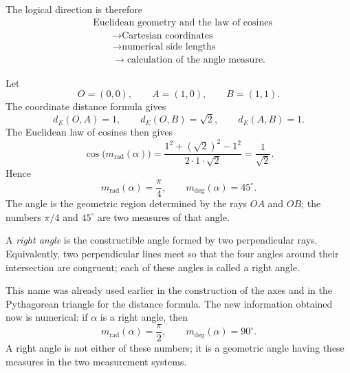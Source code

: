The logical direction is therefore
\[
\begin{aligned}
&\text{Euclidean geometry and the law of cosines}\\
&\qquad\longrightarrow\text{Cartesian coordinates}\\
&\qquad\longrightarrow\text{numerical side lengths}\\
&\qquad\longrightarrow\text{calculation of the angle measure}.
\end{aligned}
\]

\begin{examplebox}
Let
\[
O=(0,0),\qquad A=(1,0),\qquad B=(1,1).
\]
The coordinate distance formula gives
\[
d_E(O,A)=1,
\qquad
d_E(O,B)=\sqrt2,
\qquad
d_E(A,B)=1.
\]
The Euclidean law of cosines then gives
\[
\cos\bigl(m_{\mathrm{rad}}(\alpha)\bigr)
=
\frac{1^2+(\sqrt2)^2-1^2}{2\cdot1\cdot\sqrt2}
=
\frac{1}{\sqrt2}.
\]
Hence
\[
m_{\mathrm{rad}}(\alpha)=\frac{\pi}{4},
\qquad
m_{\deg}(\alpha)=45^\circ.
\]
The angle is the geometric region determined by the rays $OA$ and $OB$; the
numbers $\pi/4$ and $45^\circ$ are two measures of that angle.
\end{examplebox}

\begin{definitionbox}
A \emph{right angle} is the constructible angle formed by two perpendicular
rays. Equivalently, two perpendicular lines meet so that the four angles around
their intersection are congruent; each of these angles is called a right angle.
\end{definitionbox}

This name was already used earlier in the construction of the axes and in the
Pythagorean triangle for the distance formula. The new information obtained now
is numerical: if $\alpha$ is a right angle, then
\[
m_{\mathrm{rad}}(\alpha)=\frac{\pi}{2},
\qquad
m_{\deg}(\alpha)=90^\circ.
\]
A right angle is not either of these numbers; it is a geometric angle having
these measures in the two measurement systems.

